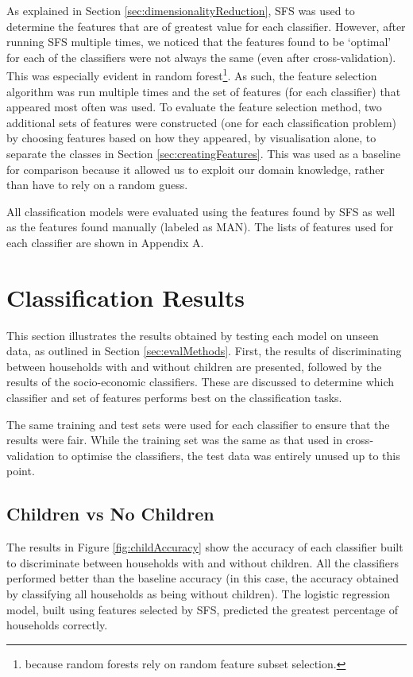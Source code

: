 As explained in Section \ref{sec:dimensionalityReduction}, SFS was used to determine the features that are of greatest value for each classifier. However, after running SFS multiple times, we noticed that the features found to be `optimal' for each of the classifiers were not always the same (even after cross-validation). This was especially evident in random forest\footnote{because random forests rely on random feature subset selection.}.  As such, the feature selection algorithm was run multiple times and the set of features (for each classifier) that appeared most often was used. To evaluate the feature selection method, two additional sets of features were constructed (one for each classification problem) by choosing features based on how they appeared, by visualisation alone, to separate the classes in Section \ref{sec:creatingFeatures}. This was used as a baseline for comparison because it allowed us to exploit our domain knowledge, rather than have to rely on a random guess.  

All classification models were evaluated using the features found by SFS as well as the features found manually (labeled as MAN). The lists of features used for each classifier are shown in Appendix A. 


\section{Classification Results}

This section illustrates the results obtained by testing each model on unseen data, as outlined in Section \ref{sec:evalMethods}. First, the results of discriminating between households with and without children are presented, followed by the results of the socio-economic classifiers. These are discussed to determine which classifier and set of features performs best on the classification tasks.

The same training and test sets were used for each classifier to ensure that the results were fair. While the training set was the same as that used in cross-validation to optimise the classifiers, the test data was entirely unused up to this point.

\subsection{Children vs No Children}

\childConf
\childAccuracy

The results in Figure \ref{fig:childAccuracy} show the accuracy of each classifier built to discriminate between households with and without children. All the classifiers performed better than the baseline accuracy (in this case, the accuracy obtained by classifying all households as being without children). The logistic regression model, built using features selected by SFS, predicted the greatest percentage of households correctly. 

